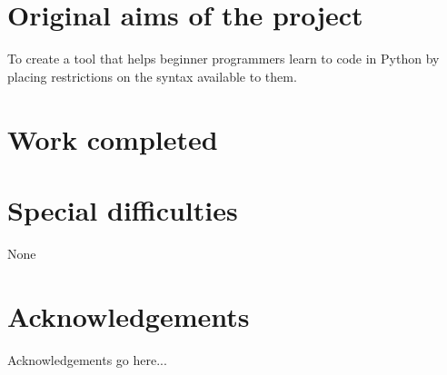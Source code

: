 \documentclass[12pt,a4paper,twoside,openright]{report}
\begin{document}


\section*{Original aims of the project}

To create a tool that helps beginner programmers learn to code in Python by placing restrictions on the syntax available to them.


\section*{Work completed}



\section*{Special difficulties}

None

\section*{Acknowledgements}

Acknowledgements go here...


\tableofcontents

\newpage


\pagestyle{headings}













\cleardoublepage
{}
{}



\appendix







\end{document}
